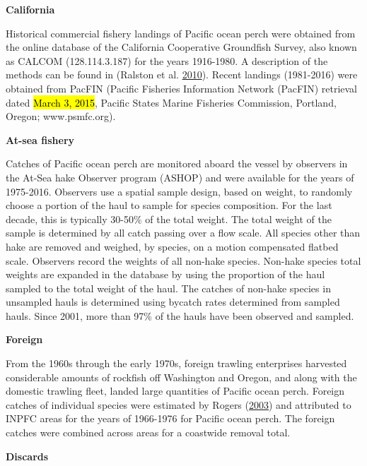 \documentclass[12pt,]{article}
\begin{document}
\textbf{California}

Historical commercial fishery landings of Pacific ocean perch were
obtained from the online database of the California Cooperative
Groundfish Survey, also known as CALCOM (128.114.3.187) for the years
1916-1980. A description of the methods can be found in (Ralston et al.
\protect\hyperlink{ref-ralston_documentation_2010}{2010}). Recent
landings (1981-2016) were obtained from PacFIN (Pacific Fisheries
Information Network (PacFIN) retrieval dated \hl{March 3, 2015}, Pacific
States Marine Fisheries Commission, Portland, Oregon; www.psmfc.org).

\textbf{At-sea fishery}

Catches of Pacific ocean perch are monitored aboard the vessel by
observers in the At-Sea hake Observer program (ASHOP) and were available
for the years of 1975-2016. Observers use a spatial sample design, based
on weight, to randomly choose a portion of the haul to sample for
species composition. For the last decade, this is typically 30-50\% of
the total weight. The total weight of the sample is determined by all
catch passing over a flow scale. All species other than hake are removed
and weighed, by species, on a motion compensated flatbed scale.
Observers record the weights of all non-hake species. Non-hake species
total weights are expanded in the database by using the proportion of
the haul sampled to the total weight of the haul. The catches of
non-hake species in unsampled hauls is determined using bycatch rates
determined from sampled hauls. Since 2001, more than 97\% of the hauls
have been observed and sampled.

\textbf{Foreign}

From the 1960s through the early 1970s, foreign trawling enterprises
harvested considerable amounts of rockfish off Washington and Oregon,
and along with the domestic trawling fleet, landed large quantities of
Pacific ocean perch. Foreign catches of individual species were
estimated by Rogers (\protect\hyperlink{ref-rogers_species_2003}{2003})
and attributed to INPFC areas for the years of 1966-1976 for Pacific
ocean perch. The foreign catches were combined across areas for a
coastwide removal total.

\textbf{Discards}
\end{document}
